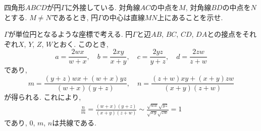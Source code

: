 \begin{bprb}[Newtonの定理]
四角形$ABCD$が円$\Gamma$に外接している.
対角線$AC$の中点を$M$, 対角線$BD$の中点を$N$とする.
$M\neq N$であるとき, 円$\Gamma$の中心は直線$MN$上にあることを示せ.
\end{bprb}
\begin{ifsol*}
$\Gamma$が単位円となるような座標で考える.
円$\Gamma$と辺$AB$, $BC$, $CD$, $DA$との接点をそれぞれ$X$, $Y$, $Z$, $W$とおく.
このとき,
\[a=\frac{2wx}{w+x},\quad b=\frac{2xy}{x+y},\quad c=\frac{2yz}{y+z},\quad d=\frac{2zw}{z+w}\]
であり,
\[m=\frac{(y+z)wx+(w+x)yz}{(w+x)(y+z)},\quad n=\frac{(z+w)xy+(x+y)zw}{(x+y)(z+w)}\]
が得られる.
これにより,
\begin{align*}
\frac nm=\frac{(w+x)(y+z)}{(x+y)(z+w)}\sim\frac{\sqrt{wx}\sqrt{yz}}{\sqrt{xy}\sqrt{zw}}=1
\end{align*}
であり, $0$, $m$, $n$は共線である.
\end{ifsol*}